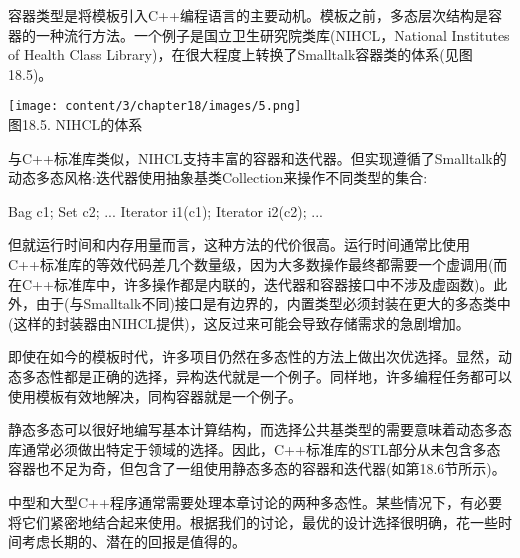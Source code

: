 容器类型是将模板引入C++编程语言的主要动机。模板之前，多态层次结构是容器的一种流行方法。一个例子是国立卫生研究院类库(NIHCL，National Institutes of Health Class Library)，在很大程度上转换了Smalltalk容器类的体系(见图18.5)。

\begin{center}
\texttt{[image: content/3/chapter18/images/5.png]} \\
图18.5. NIHCL的体系
\end{center}

与C++标准库类似，NIHCL支持丰富的容器和迭代器。但实现遵循了Smalltalk的动态多态风格:迭代器使用抽象基类Collection来操作不同类型的集合:

\begin{cpp}
Bag c1;
Set c2;
...
Iterator i1(c1);
Iterator i2(c2);
...
\end{cpp}

但就运行时间和内存用量而言，这种方法的代价很高。运行时间通常比使用C++标准库的等效代码差几个数量级，因为大多数操作最终都需要一个虚调用(而在C++标准库中，许多操作都是内联的，迭代器和容器接口中不涉及虚函数)。此外，由于(与Smalltalk不同)接口是有边界的，内置类型必须封装在更大的多态类中(这样的封装器由NIHCL提供)，这反过来可能会导致存储需求的急剧增加。

即使在如今的模板时代，许多项目仍然在多态性的方法上做出次优选择。显然，动态多态性都是正确的选择，异构迭代就是一个例子。同样地，许多编程任务都可以使用模板有效地解决，同构容器就是一个例子。

静态多态可以很好地编写基本计算结构，而选择公共基类型的需要意味着动态多态库通常必须做出特定于领域的选择。因此，C++标准库的STL部分从未包含多态容器也不足为奇，但包含了一组使用静态多态的容器和迭代器(如第18.6节所示)。

中型和大型C++程序通常需要处理本章讨论的两种多态性。某些情况下，有必要将它们紧密地结合起来使用。根据我们的讨论，最优的设计选择很明确，花一些时间考虑长期的、潜在的回报是值得的。





















